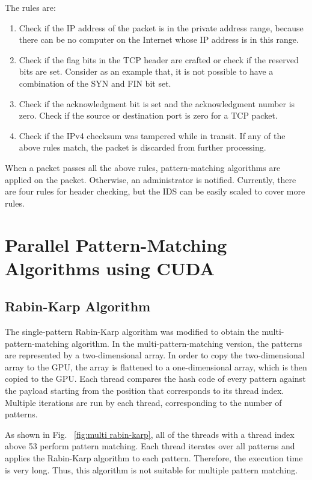 The rules are:
\begin{enumerate}[leftmargin=*]
	\item
	Check if the IP address of the packet is in the private address range, because there can be no computer on the Internet whose IP address is in this range.
	\item
	Check if the flag bits in the TCP header are crafted or check if the reserved bits are set. Consider as an example that, it is not possible to have a combination of the SYN and FIN bit set.
	\item
	Check if the acknowledgment bit is set and the acknowledgment number is zero. Check if the source or destination port is zero for a TCP packet.
	\item
	Check if the IPv4 checksum was tampered while in transit.
	If any of the above rules match, the packet is discarded from further processing.
\end{enumerate}
\vspace{\topsep}
When a packet passes all the above rules, pattern-matching algorithms are applied on the packet. Otherwise, an administrator is notified. Currently, there are four rules for header checking, but the IDS can be easily scaled to cover more rules.

\section{Parallel Pattern-Matching Algorithms using CUDA}
\vspace{\topsep}
\subsection{Rabin-Karp Algorithm}
The single-pattern Rabin-Karp algorithm was modified to obtain the multi-pattern-matching algorithm. In the multi-pattern-matching version, the patterns are represented by a two-dimensional array. In order to copy the two-dimensional array to the GPU, the array is flattened to a one-dimensional array, which is then copied to the GPU. Each thread compares the hash code of every pattern against the payload starting from the position that corresponds to its thread index. Multiple iterations are run by each thread, corresponding to the number of patterns. 

As shown in Fig. ~\ref{fig:multi rabin-karp}, all of the threads with a thread index above 53 perform pattern matching. Each thread iterates over all patterns and applies the Rabin-Karp algorithm to each pattern. Therefore, the execution time is very long. Thus, this algorithm is not suitable for multiple pattern matching.

